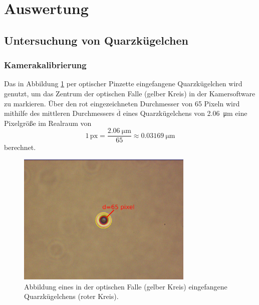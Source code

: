 \newpage
\section{Auswertung}

    \subsection{Untersuchung von Quarzkügelchen}
        \subsubsection{Kamerakalibrierung}
        \label{sec:Pixel}
            Das in Abbildung \ref{fig:cal_cam} per optischer Pinzette eingefangene Quarzkügelchen wird genutzt, um das Zentrum der optischen Falle (gelber Kreis) in der Kamersoftware zu markieren. Über den
            rot eingezeichneten Durchmesser von 65 Pixeln wird mithilfe des mittleren Durchmessers $\overline{\text{d}}$ eines Quarzkügelchens von \SI{2.06}{\micro\metre} eine Pixelgröße im Realraum von 
            \begin{equation*}
                1\,\text{px} = \frac{\SI{2.06}{\micro\metre}}{65} \approx \SI{0.03169}{\micro\metre}
            \end{equation*}
            berechnet.
            \begin{figure}[h]
            \centering
            \includegraphics[width = 0.75\textwidth]{pictures/cal_cam.png}
            \caption{Abbildung eines in der optischen Falle (gelber Kreis) eingefangene Quarzkügelchens (roter Kreis).}
            \label{fig:cal_cam}
            \end{figure}
            \FloatBarrier

        \newpage
